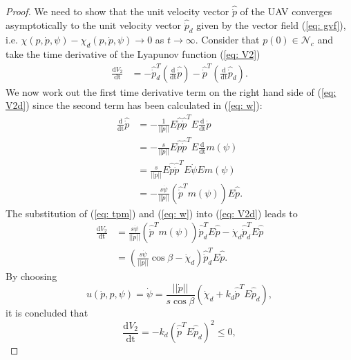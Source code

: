 \documentclass[letterpaper, 10 pt, conference]{ieeeconf}  %
\begin{document}
\begin{proof}
	We need to show that the unit velocity vector $\hat {\dot p}$ of the UAV converges asymptotically to the unit velocity vector $\hat {\dot p}_d$ given by the vector field (\ref{eq: gvf}), i.e. $\chi(p, \dot p, \psi) - \chi_d(p, \dot p, \psi) \to 0$ as $t \to \infty$. Consider that $p(0)\in\mathcal{N}_c$ and take the time derivative of the Lyapunov function (\ref{eq: V2})
\begin{align}
	\frac{\mathrm{d}V_2}{\mathrm{dt}} &= -\hat{\dot p}_d^T \left(\frac{\mathrm{d}}{\mathrm{dt}} \hat {\dot p}\right) - \hat {\dot p}^T \left(\frac{\mathrm{d}}{\mathrm{dt}}\hat{\dot p}_d\right). \label{eq: V2d}
\end{align}
We now work out the first time derivative term on the right hand side of (\ref{eq: V2d}) since the second term has been calculated in (\ref{eq: w}):
\begin{align}
\frac{\mathrm{d}}{\mathrm{dt}} \hat {\dot p} &= -\frac{1}{||\dot p||}E
	\hat{\dot p}\hat{\dot p}^TE\frac{\mathrm{d}}{\mathrm{dt}}\dot p\nonumber \\
	&= -\frac{s}{||\dot p||}E\hat{\dot p}\hat{\dot p}^TE \frac{\mathrm{d}}{\mathrm{dt}} m(\psi) \nonumber \\
	&= \frac{s}{||\dot p||}E\hat{\dot p}\hat{\dot p}^TE \dot\psi E m(\psi) \nonumber \\
	&= -\frac{s\dot\psi}{||\dot p||}\left(\hat{\dot p}^T m(\psi)\right)E \hat{\dot p}. \label{eq: tpm}
\end{align}
The substitution of (\ref{eq: tpm}) and (\ref{eq: w}) into (\ref{eq: V2d}) leads to
\begin{align}
	\frac{\mathrm{d}V_2}{\mathrm{dt}} &= \frac{s\dot\psi}{||\dot p||}\left(\hat{\dot p}^T m(\psi)\right)\hat{\dot p}_d^TE \hat{\dot p} - \dot\chi_d\hat{\dot p}_d^T E\hat{\dot p} \nonumber \\
	&= \left(\frac{s\dot\psi}{||\dot p||}\cos{\beta} - \dot\chi_d \right)\hat{\dot p}_d^T E\hat{\dot p}.
\end{align}
By choosing
\begin{equation}
	u(\dot p, p, \psi) = \dot\psi = \frac{||\dot p||}{s\cos{\beta}}\left (\dot\chi_d + k_d \hat{\dot p}^TE\hat{\dot p}_d\right),
	\label{eq: controlac}
\end{equation}
it is concluded that
\begin{equation}
	\frac{\mathrm{d}V_2}{\mathrm{dt}} = -k_d (\hat{\dot p}^TE\hat{\dot p}_d)^2 \leq 0,
	\label{eq: bajo}
\end{equation}

\end{proof}
\end{document}

